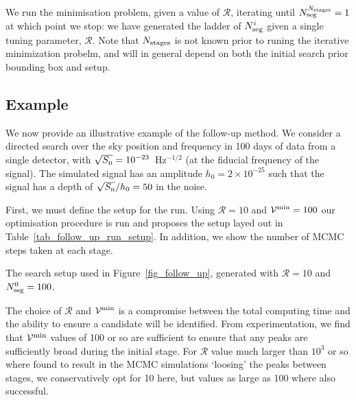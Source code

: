 \documentclass[aps, prd, twocolumn, superscriptaddress, floatfix, showpacs, nofootinbib, longbibliography]{revtex4-1}
\begin{document}
We run the minimisation problem, given a value of $\mathcal{R}$, iterating
until $N_{\rm seg}^{N_{\rm stages}} = 1$ at which point we stop: we have generated the
ladder of $N_{\rm seg}^i$ given a single tuning parameter, $\mathcal{R}$. Note that
$N_{\rm stages}$ is not known prior to runing the iterative minimization probelm, and
will in general depend on both the initial search prior bounding box and setup.

\subsection{Example}

We now provide an illustrative example of the follow-up method. We consider a
directed search over the sky position and frequency in 100 days of data from a
single detector, with $\sqrt{S_{\rm n}}=10^{-23}$~Hz$^{-1/2}$ (at the fiducial
frequency of the signal). The simulated signal has an amplitude
$h_0=2\times10^{-25}$ such that the signal has a depth of $\sqrt{S_{\rm n}}/h_0=50$
in the noise.

First, we must define the setup for the run. Using $\mathcal{R}=10$ and
$\mathcal{V}^{\rm min}=100$ our optimisation procedure is run and proposes the setup
layed out in Table~\ref{tab_follow_up_run_setup}. In addition, we show the
number of MCMC steps taken at each stage.
\begin{table}[htb]
\caption{The search setup used in Figure~\ref{fig_follow_up}, generated with
$\mathcal{R}=10$ and $N_{\rm seg}^0=100$.}
\label{tab_follow_up_run_setup}

\end{table}

The choice of $\mathcal{R}$ and $\mathcal{V}^{\rm min}$ is a compromise between the
total computing time and the ability to ensure a candidate will be identified.
From experimentation, we find that $\mathcal{V}^{\rm min}$ values of 100 or so are
sufficient to ensure that any peaks are sufficiently broad during the
initial stage. For $\mathcal{R}$ value much larger than $10^{3}$ or so where
found to result in the MCMC simulations `loosing' the peaks between stages, we
conservatively opt for 10 here, but values as large as 100 where also successful.
\end{document}
